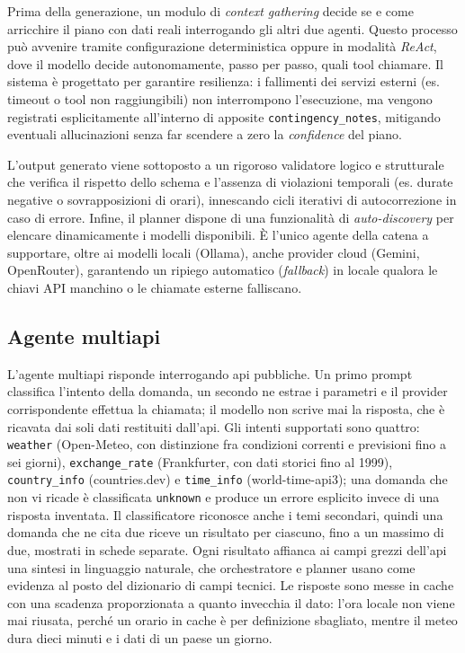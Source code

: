 \documentclass[11pt]{article}
\begin{document}
Prima della generazione, un modulo di \textit{context gathering} decide se e come arricchire il piano con dati reali interrogando gli altri due agenti. Questo processo può avvenire tramite configurazione deterministica oppure in modalità \textit{ReAct}, dove il modello decide autonomamente, passo per passo, quali tool chiamare. Il sistema è progettato per garantire resilienza: i fallimenti dei servizi esterni (es. timeout o tool non raggiungibili) non interrompono l'esecuzione, ma vengono registrati esplicitamente all'interno di apposite \texttt{contingency\_notes}, mitigando eventuali allucinazioni senza far scendere a zero la \textit{confidence} del piano.

L'output generato viene sottoposto a un rigoroso validatore logico e strutturale che verifica il rispetto dello schema e l'assenza di violazioni temporali (es. durate negative o sovrapposizioni di orari), innescando cicli iterativi di autocorrezione in caso di errore. Infine, il planner dispone di una funzionalità di \textit{auto-discovery} per elencare dinamicamente i modelli disponibili. È l'unico agente della catena a supportare, oltre ai modelli locali (Ollama), anche provider cloud (Gemini, OpenRouter), garantendo un ripiego automatico (\textit{fallback}) in locale qualora le chiavi API manchino o le chiamate esterne falliscano.

\subsection{Agente multiapi}

L'agente multiapi risponde interrogando api pubbliche. Un primo prompt classifica l'intento della domanda, un secondo ne estrae i parametri e il provider corrispondente effettua la chiamata; il modello non scrive mai la risposta, che è ricavata dai soli dati restituiti dall'api. Gli intenti supportati sono quattro: \texttt{weather} (Open-Meteo, con distinzione fra condizioni correnti e previsioni fino a sei giorni), \texttt{exchange\_rate} (Frankfurter, con dati storici fino al 1999), \texttt{country\_info} (countries.dev) e \texttt{time\_info} (world-time-api3); una domanda che non vi ricade è classificata \texttt{unknown} e produce un errore esplicito invece di una risposta inventata. Il classificatore riconosce anche i temi secondari, quindi una domanda che ne cita due riceve un risultato per ciascuno, fino a un massimo di due, mostrati in schede separate. Ogni risultato affianca ai campi grezzi dell'api una sintesi in linguaggio naturale, che orchestratore e planner usano come evidenza al posto del dizionario di campi tecnici. Le risposte sono messe in cache con una scadenza proporzionata a quanto invecchia il dato: l'ora locale non viene mai riusata, perché un orario in cache è per definizione sbagliato, mentre il meteo dura dieci minuti e i dati di un paese un giorno.
\end{document}
